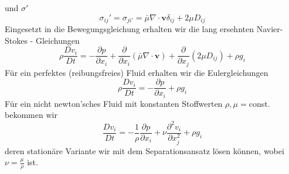 \documentclass[
	11pt, %
]{beamer}
\begin{document}
\begin{frame}
	und $\sigma'$
	\begin{equation}
		\sigma_{ij}'=\sigma_{ji'}=\bar{\mu}\nabla\cdot\textbf{v}\delta_{ij}+2\mu D_{ij}
	\end{equation}
	Eingesetzt in die Bewegungsgleichung erhalten wir die lang ersehnten Navier-Stokes - Gleichungen
	\begin{equation}
		\rho \frac{Dv_i}{Dt} =-\frac{\partial p}{\partial x_i}+\frac{\partial}{\partial x_i} \left(\bar{\mu}\nabla\cdot\textbf{v}\right)+\frac{\partial}{\partial x_j}\left(2\mu D_{ij}\right) +\rho g_i 
	\end{equation}
	F\"ur ein  perfektes (reibungsfreies) Fluid erhalten wir die Eulergleichungen
	\begin{equation}
		\rho \frac{Dv_i}{Dt} =-\frac{\partial p}{\partial x_i} +\rho g_i 
	\end{equation}
	F\"ur ein nicht newton'sches Fluid mit konstanten Stoffwerten $\rho,\mu=$const. bekommen wir
	\begin{equation}
		\frac{Dv_i}{Dt} =-\frac{1}{\rho}\frac{\partial p}{\partial x_i}+\nu \frac{\partial^2 v_i}{\partial x_j^2} +\rho g_i 
	\end{equation}
	deren station\"are Variante wir mit dem Separationsansatz l\"osen k\"onnen, wobei $\nu=\frac{\mu}{\rho}$ ist.
\end{frame}
\end{document}

